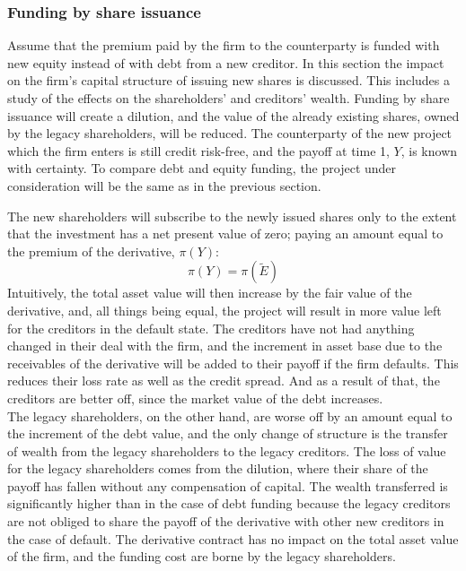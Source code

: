 \documentclass[main.tex]{subfiles}
\begin{document}
    \subsubsection{Funding by share issuance}
        Assume that the premium paid by the firm to the counterparty is funded with new equity instead of with debt from a new creditor. 
        In this section the impact on the firm's capital structure of issuing new shares is discussed.
        This includes a study of the effects on the shareholders' and creditors' wealth. 
        Funding by share issuance will create a dilution, and the value of the already existing shares, owned by the legacy shareholders, will be reduced. 
        The counterparty of the new project which the firm enters is still credit risk-free, 
        and the payoff at time 1, $Y$, is known with certainty. 
        To compare debt and equity funding, 
        the project under consideration will be the same as in the previous section.

        The new shareholders will subscribe to the newly issued shares only to the extent that the investment has a net present value of zero; paying an amount equal to the premium of the derivative, $\pi(Y)$:
        \begin{equation}\label{eqn:derivative-zero-npv}
            \pi(Y) = \pi(\tilde{E})
        \end{equation}
        Intuitively, the total asset value will then increase by the fair value of the derivative, and, all things being equal, the project will result in more value left for the creditors in the default state. 
        The creditors have not had anything changed in their deal with the firm, and the increment in asset base due to the receivables of the derivative will be added to their payoff if the firm defaults. 
        This reduces their loss rate as well as the credit spread.
        And as a result of that, the creditors are better off, since the market value of the debt increases.\\
        The legacy shareholders, on the other hand, are worse off by an amount equal to the increment of the debt value, and the only change of structure is the transfer of wealth from the legacy shareholders to the legacy creditors. 
        The loss of value for the legacy shareholders comes from the dilution, where their share of the payoff has fallen without any compensation of capital. 
        The wealth transferred is significantly higher than in the case of debt funding because the legacy creditors are not obliged to share the payoff of the derivative with other new creditors in the case of default. 
        The derivative contract has no impact on the total asset value of the firm, and the funding cost are borne by the legacy shareholders.
\end{document}
